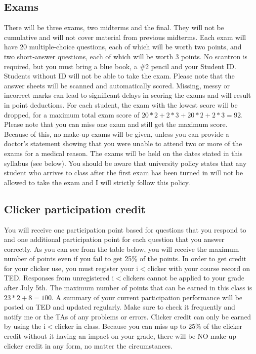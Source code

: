 \documentclass[A4paper,12pt]{article}
\begin{document}
\subsection{Exams}
There will be three exams, two midterms and the final. They will not be cumulative and will not cover material from previous midterms. Each exam will have 20 multiple-choice questions, each of which will be worth two points, and two short-answer questions, each of which will be worth 3 points. No scantron is required, but you must bring a blue book, a \#2 pencil and your Student ID. Students without ID will not be able to take the exam. Please note that the answer sheets will be scanned and automatically scored. Missing, messy or incorrect marks can lead to significant delays in scoring the exams and will result in point deductions. For each student, the exam with the lowest score will be dropped, for a maximum total exam score of $20*2 + 2*3 + 20*2 + 2*3 = 92$. Please note that you can miss one exam and still get the maximum score. Because of this, no make-up exams will be given, unless you can provide a doctor's statement showing that you were unable to attend two or more of the exams for a medical reason. The exams will be held on the dates stated in this syllabus (see below).  You should be aware that university policy states that any student who arrives to class after the first exam has been turned in will not be allowed to take the exam and I will strictly follow this policy.
\subsection{Clicker participation credit}
You will receive one participation point based for questions that you respond to and one additional participation point for each question that you answer correctly. As you can see from the table below, you will receive the maximum number of points even if you fail to get 25\% of the points. In order to get credit for your clicker use, you must register your i$<$clicker with your course record on TED. Responses from unregistered i$<$clickers cannot be applied to your grade after July 5th. The maximum number of points that can be earned in this class is $23*2 + 8 = 100$. A summary of your current participation performance will be posted on TED and updated regularly. Make sure to check it frequently and notify me or the TAs of any problems or errors. Clicker credit can only be earned by using the i$<$clicker in class. Because you can miss up to 25\% of the clicker credit without it having an impact on your grade, there will be NO make-up clicker credit in any form, no matter the circumstances.
\end{document}

